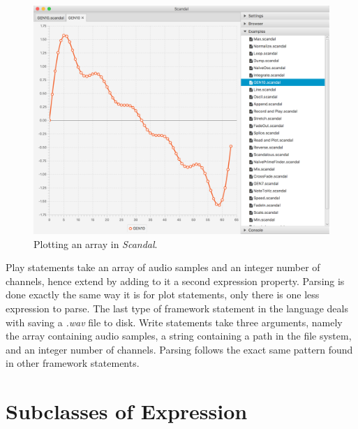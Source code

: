 \begin{figure}[b!]
	\includegraphics[width=4.5in]{img/plot}
	\caption[Plotting an array in \emph{Scandal}.]{Plotting an array in \emph{Scandal}.}
\end{figure}

\newpage Play statements take an array of audio samples and an integer number of channels, hence extend  by adding to it a second expression property. Parsing is done exactly the same way it is for plot statements, only there is one less expression to parse. The last type of framework statement in the language deals with saving a \emph{.wav} file to disk. Write statements take three arguments, namely the array containing audio samples, a string containing a path in the file system, and an integer number of channels. Parsing follows the exact same pattern found in other framework statements.

\section{Subclasses of Expression}

